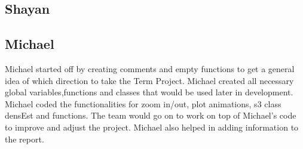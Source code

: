 \documentclass{article}
\begin{document}
\subsection{Shayan}

\subsection{Michael}
Michael started off by creating comments and empty functions to get a general idea of which direction to take the Term Project. Michael created all necessary global variables,functions and classes that would be used later in development. Michael coded the functionalities for zoom in/out, plot animations, s3 class densEst and functions. The team would go on to work on top of Michael's code to improve and adjust the project. Michael also helped in adding information to the report.


%
%
\end{document}
